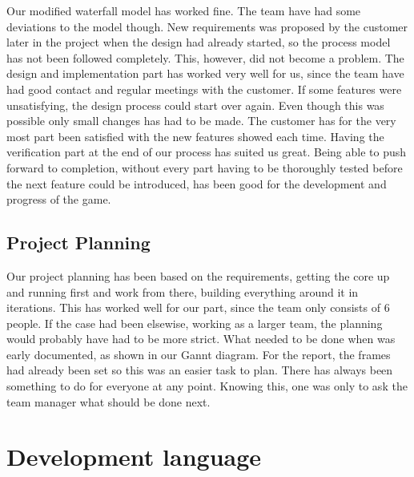 Our modified waterfall model has worked fine. The team have had some deviations to the model though. New requirements was
proposed by the customer later in the project when the design had already started, so the process model has not been followed
completely. This, however, did not become a problem. The design and implementation part has worked very well for us, since the 
team have had good contact and regular meetings with the customer. If some features were unsatisfying, the design process could 
start over again. Even though this was possible only small changes has had to be made. The customer has for the very most part 
been satisfied with the new features showed each time. Having the verification part at the end of our process has suited us 
great. Being able to push forward to completion, without every part having to be thoroughly tested before the next feature 
could be introduced, has been good for the development and progress of the game. 

\subsection{Project Planning}

Our project planning has been based on the requirements, getting the core up and running first and work from there, building 
everything around it in iterations. This has worked well for our part, since the team only consists of 6 people. If the case 
had been elsewise, working as a larger team, the planning would probably have had to be more strict. What needed to be done 
when was early documented, as shown in our Gannt diagram. For the report, the frames had already been set so this was an easier 
task to plan. There has always been something to do for everyone at any point. Knowing this, one was only to ask the team manager what should be done next.


\section{Development language}

